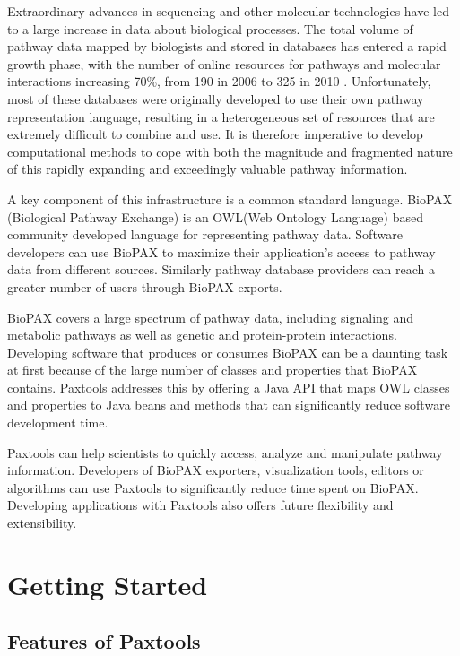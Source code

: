 \documentclass{tufte-book}
\begin{document}
Extraordinary advances in sequencing and other molecular technologies have led to a large increase in data about biological processes. The total volume of pathway data mapped by biologists and stored in databases has entered a rapid growth phase, with the number of online resources for pathways and molecular interactions increasing 70\%, from 190 in 2006 to 325 in 2010 \cite{Bader2006}. Unfortunately, most of these databases were originally developed to use their own pathway representation language, resulting in a heterogeneous set of resources that are extremely difficult to combine and use. It is therefore imperative to develop computational methods to cope with both the magnitude and fragmented nature of this rapidly expanding and exceedingly valuable pathway information.

A key component of this infrastructure is a common standard language. BioPAX (Biological Pathway Exchange) \cite{Demir2010} is an OWL(Web Ontology Language) based community developed language for representing pathway data. Software developers can use BioPAX to maximize their application's access to pathway data from different sources. Similarly pathway database providers can reach a greater number of users through BioPAX exports.

BioPAX covers a large spectrum of pathway data, including signaling and metabolic pathways as well as genetic and protein-protein interactions. Developing software that produces or consumes BioPAX can be a daunting task at first because of the large number of classes and properties that BioPAX contains. Paxtools addresses this by offering a Java API that maps OWL classes and properties to Java beans and methods that can significantly reduce software development time. 

Paxtools can help scientists to quickly access, analyze and manipulate pathway information. Developers of BioPAX exporters, visualization tools, editors or algorithms can use Paxtools to significantly reduce time spent on BioPAX. Developing applications with Paxtools also offers future flexibility and extensibility. 

\mainmatter


\chapter{Getting Started}
\label{ch:features}

\section{Features of Paxtools}
\end{document}
